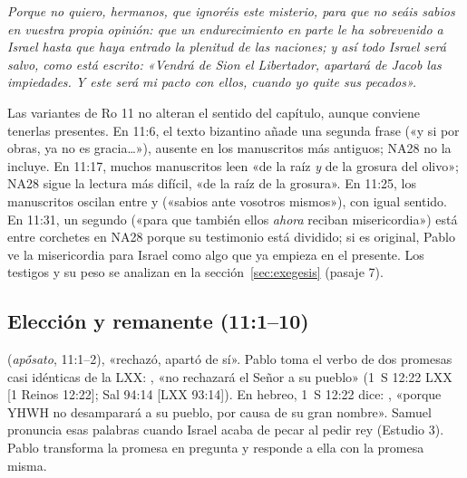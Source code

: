 \begin{cita}[fontupper=\upshape]
\par\smallskip
\itshape Porque no quiero, hermanos, que ignoréis este misterio, para que no seáis sabios en vuestra propia opinión: que un endurecimiento en parte le ha sobrevenido a Israel hasta que haya entrado la plenitud de las naciones; y así todo Israel será salvo, como está escrito: «Vendrá de Sion el Libertador, apartará de Jacob las impiedades. Y este será mi pacto con ellos, cuando yo quite sus pecados».
\end{cita}

\begin{nota}
Las variantes de Ro 11 no alteran el sentido del capítulo, aunque conviene tenerlas presentes. En 11:6, el texto bizantino añade una segunda frase («y si por obras, ya no es gracia\ldots»), ausente en los manuscritos más antiguos; NA28 no la incluye. En 11:17, muchos manuscritos leen «de la raíz \emph{y} de la grosura del olivo»; NA28 sigue la lectura más difícil, «de la raíz de la grosura». En 11:25, los manuscritos oscilan entre  y  («sabios ante vosotros mismos»), con igual sentido. En 11:31, un segundo  («para que también ellos \emph{ahora} reciban misericordia») está entre corchetes en NA28 porque su testimonio está dividido; si es original, Pablo ve la misericordia para Israel como algo que ya empieza en el presente. Los testigos y su peso se analizan en la sección~\ref{sec:exegesis} (pasaje 7).
\end{nota}

\subsection{Elección y remanente (11:1--10)}

\textbf{} (\emph{apṓsato}, 11:1--2), «rechazó, apartó de sí». Pablo toma el verbo de dos promesas casi idénticas de la LXX: , «no rechazará el Señor a su pueblo» (1~S 12:22 LXX [1 Reinos 12:22]; Sal 94:14 [LXX 93:14]). En hebreo, 1~S 12:22 dice: , «porque YHWH no desamparará a su pueblo, por causa de su gran nombre». Samuel pronuncia esas palabras cuando Israel acaba de pecar al pedir rey (Estudio 3). Pablo transforma la promesa en pregunta y responde a ella con la promesa misma.

